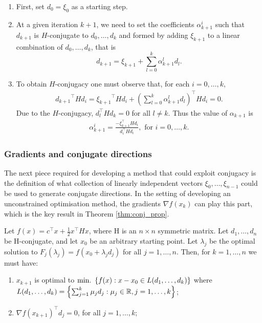 \begin{enumerate}
	\item First, set $d_0 = \xi_0$ as a starting step.
	\item At a given iteration $k+1$, we need to set the coefficients $\alpha_{k+1}^i$ such that $d_{k+1}$ is $H$-conjugate to $d_0,\dots,d_k$ and formed by adding $\xi_{k+1}$ to a linear combination of $d_0, \dots, d_{k}$, that is
	$$d_{k+1} = \xi_{k+1} + \sum_{l=0}^k \alpha_{k+1}^l d_l.$$
	\item To obtain $H$-conjugacy one must observe that, for each $i = 0, \dots, k$, 
	\begin{align*}
		{d_{k+1}}^\top H d_i = {\xi_{k+1}}^\top Hd_i + \left(\sum_{l=0}^k \alpha_{k+1}^l d_l \right)^\top Hd_i=0.  
	\end{align*}
	Due to the $H$-conjugacy, $d_l^\top Hd_k = 0$ for all $l \neq k$. Thus the value of $\alpha_{k+1}$ is
	\begin{align}	
		\alpha_{k+1}^i = \frac{-\xi_{k+1}^\top H d_i}{d_i^\top Hd_i}, \text{ for } i = 0,\dots, k. \label{eq:GS_weight}		
	\end{align}

\end{enumerate}

\subsubsection{Gradients and conjugate directions}

The next piece required for developing a method that could exploit conjugacy is the definition of what collection of linearly independent vectors $\xi_0,\dots,\xi_{n-1}$ could be used to generate conjugate directions. In the setting of developing an unconstrained optimisation method, the gradients $\nabla f(x_k)$ can play this part, which is the key result in Theorem \ref{thm:conj_prop}.

\begin{theorem} \label{thm:conj_prop}
Let $f(x) = c^\top x + \frac{1}{2} x^\top Hx$, where H is an  $n\times n$ symmetric matrix. Let $d_1, \dots, d_n$ be H-conjugate, and let $x_0$ be an arbitrary starting point. Let $\lambda_j$ be the optimal solution to $F_j(\lambda_j) = f(x_0 + \lambda_jd_j)$ for all $j = 1,\dots,n$. Then, for $k=1,\dots,n$ we must have:
\begin{enumerate}
\item $x_{k+1}$ is optimal to $\mathop{\text{min.~}}\left\{ f(x) : x-x_0 \in L(d_1,\dots,d_k) \right \}$ where \lb $L(d_1,\dots,d_k)=\left\{ \sum_{j=1}^k \mu_jd_j : \mu_j \in \mathbb{R}, j = 1,\dots,k \right \}$;
\item $\nabla f(x_{k+1})^\top d_j = 0$, for all $j=1,\dots,k$;
\end{enumerate}
\end{theorem}


